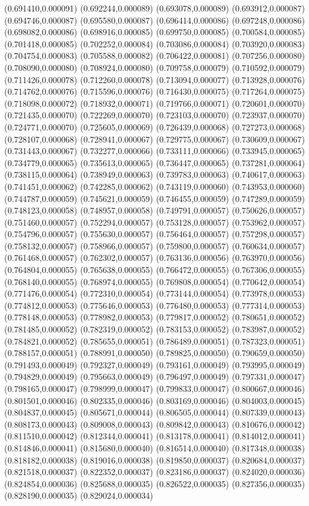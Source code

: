 {(0.691410,0.000091) (0.692244,0.000089) (0.693078,0.000089) (0.693912,0.000087) (0.694746,0.000087) (0.695580,0.000087) (0.696414,0.000086) (0.697248,0.000086) (0.698082,0.000086) (0.698916,0.000085) (0.699750,0.000085) (0.700584,0.000085) (0.701418,0.000085) (0.702252,0.000084) (0.703086,0.000084) (0.703920,0.000083) (0.704754,0.000083) (0.705588,0.000082) (0.706422,0.000081) (0.707256,0.000080) (0.708090,0.000080) (0.708924,0.000080) (0.709758,0.000079) (0.710592,0.000079) (0.711426,0.000078) (0.712260,0.000078) (0.713094,0.000077) (0.713928,0.000076) (0.714762,0.000076) (0.715596,0.000076) (0.716430,0.000075) (0.717264,0.000075) (0.718098,0.000072) (0.718932,0.000071) (0.719766,0.000071) (0.720601,0.000070) (0.721435,0.000070) (0.722269,0.000070) (0.723103,0.000070) (0.723937,0.000070) (0.724771,0.000070) (0.725605,0.000069) (0.726439,0.000068) (0.727273,0.000068) (0.728107,0.000068) (0.728941,0.000067) (0.729775,0.000067) (0.730609,0.000067) (0.731443,0.000067) (0.732277,0.000066) (0.733111,0.000066) (0.733945,0.000065) (0.734779,0.000065) (0.735613,0.000065) (0.736447,0.000065) (0.737281,0.000064) (0.738115,0.000064) (0.738949,0.000063) (0.739783,0.000063) (0.740617,0.000063) (0.741451,0.000062) (0.742285,0.000062) (0.743119,0.000060) (0.743953,0.000060) (0.744787,0.000059) (0.745621,0.000059) (0.746455,0.000059) (0.747289,0.000059) (0.748123,0.000058) (0.748957,0.000058) (0.749791,0.000057) (0.750626,0.000057) (0.751460,0.000057) (0.752294,0.000057) (0.753128,0.000057) (0.753962,0.000057) (0.754796,0.000057) (0.755630,0.000057) (0.756464,0.000057) (0.757298,0.000057) (0.758132,0.000057) (0.758966,0.000057) (0.759800,0.000057) (0.760634,0.000057) (0.761468,0.000057) (0.762302,0.000057) (0.763136,0.000056) (0.763970,0.000056) (0.764804,0.000055) (0.765638,0.000055) (0.766472,0.000055) (0.767306,0.000055) (0.768140,0.000055) (0.768974,0.000055) (0.769808,0.000054) (0.770642,0.000054) (0.771476,0.000054) (0.772310,0.000054) (0.773144,0.000054) (0.773978,0.000053) (0.774812,0.000053) (0.775646,0.000053) (0.776480,0.000053) (0.777314,0.000053) (0.778148,0.000053) (0.778982,0.000053) (0.779817,0.000052) (0.780651,0.000052) (0.781485,0.000052) (0.782319,0.000052) (0.783153,0.000052) (0.783987,0.000052) (0.784821,0.000052) (0.785655,0.000051) (0.786489,0.000051) (0.787323,0.000051) (0.788157,0.000051) (0.788991,0.000050) (0.789825,0.000050) (0.790659,0.000050) (0.791493,0.000049) (0.792327,0.000049) (0.793161,0.000049) (0.793995,0.000049) (0.794829,0.000049) (0.795663,0.000049) (0.796497,0.000049) (0.797331,0.000047) (0.798165,0.000047) (0.798999,0.000047) (0.799833,0.000047) (0.800667,0.000046) (0.801501,0.000046) (0.802335,0.000046) (0.803169,0.000046) (0.804003,0.000045) (0.804837,0.000045) (0.805671,0.000044) (0.806505,0.000044) (0.807339,0.000043) (0.808173,0.000043) (0.809008,0.000043) (0.809842,0.000043) (0.810676,0.000042) (0.811510,0.000042) (0.812344,0.000041) (0.813178,0.000041) (0.814012,0.000041) (0.814846,0.000041) (0.815680,0.000040) (0.816514,0.000040) (0.817348,0.000038) (0.818182,0.000038) (0.819016,0.000038) (0.819850,0.000037) (0.820684,0.000037) (0.821518,0.000037) (0.822352,0.000037) (0.823186,0.000037) (0.824020,0.000036) (0.824854,0.000036) (0.825688,0.000035) (0.826522,0.000035) (0.827356,0.000035) (0.828190,0.000035) (0.829024,0.000034) }
